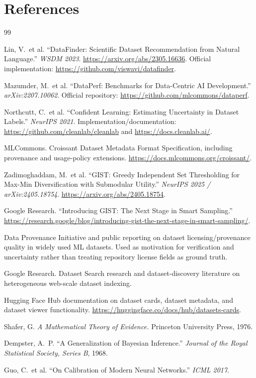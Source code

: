 \documentclass[11pt]{article}
\begin{document}
\section{References}
\begin{thebibliography}{99}

 Lin, V.\ et al. ``DataFinder: Scientific Dataset Recommendation from Natural
Language.'' \textit{WSDM 2023}. \url{https://arxiv.org/abs/2305.16636}. Official implementation:
\url{https://github.com/viswavi/datafinder}.

 Mazumder, M.\ et al. ``DataPerf: Benchmarks for Data-Centric AI Development.''
\textit{arXiv:2207.10062}. Official repository: \url{https://github.com/mlcommons/dataperf}.

 Northcutt, C.\ et al. ``Confident Learning: Estimating Uncertainty in Dataset Labels.''
\textit{NeurIPS 2021}. Implementation/documentation: \url{https://github.com/cleanlab/cleanlab} and
\url{https://docs.cleanlab.ai/}.

 MLCommons. Croissant Dataset Metadata Format Specification, including provenance and
usage-policy extensions. \url{https://docs.mlcommons.org/croissant/}.

 Zadimoghaddam, M.\ et al. ``GIST: Greedy Independent Set Thresholding for Max-Min
Diversification with Submodular Utility.'' \textit{NeurIPS 2025 / arXiv:2405.18754}.
\url{https://arxiv.org/abs/2405.18754}.

 Google Research. ``Introducing GIST: The Next Stage in Smart Sampling.''
\url{https://research.google/blog/introducing-gist-the-next-stage-in-smart-sampling/}.

 Data Provenance Initiative and public reporting on dataset licensing/provenance
quality in widely used ML datasets. Used as motivation for verification and uncertainty rather than
treating repository license fields as ground truth.

 Google Research. Dataset Search research and dataset-discovery literature on
heterogeneous web-scale dataset indexing.

 Hugging Face Hub documentation on dataset cards, dataset metadata, and dataset viewer
functionality. \url{https://huggingface.co/docs/hub/datasets-cards}.

 Shafer, G. \textit{A Mathematical Theory of Evidence.} Princeton University Press,
1976.

 Dempster, A.\ P. ``A Generalization of Bayesian Inference.'' \textit{Journal of the
Royal Statistical Society, Series B}, 1968.

 Guo, C.\ et al. ``On Calibration of Modern Neural Networks.'' \textit{ICML 2017}.

\end{thebibliography}
\end{document}
